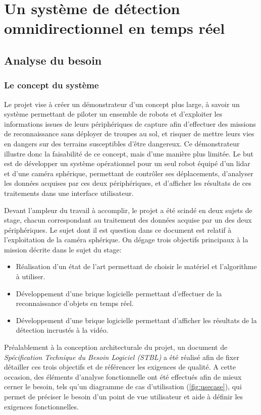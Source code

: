 \chapter{Un système de détection omnidirectionnel en temps réel}

	\section{Analyse du besoin}

		\subsection{Le concept du système}
			
			Le projet vise à créer un démonstrateur d'un concept plus large, à savoir un système permettant de piloter un ensemble de robots et d'exploiter les informations issues de leurs périphériques de capture afin d'effectuer des missions de reconnaissance sans déployer de troupes au sol, et risquer de mettre leurs vies en dangers sur des terrains susceptibles d'être dangereux. Ce démonstrateur illustre donc la faisabilité de ce concept, mais d'une manière plus limitée. Le but est de développer un système opérationnel pour un seul robot équipé d'un \gls{lidar} et d'une caméra sphérique, permettant de contrôler ses déplacements, d'analyser les données acquises par ces deux périphériques, et d'afficher les résultats de ces traitements dans une interface utilisateur.
			\par
			Devant l'ampleur du travail à accomplir, le projet a été scindé en deux sujets de stage, chacun correspondant au traitement des données acquise par un des deux périphériques. Le sujet dont il est question dans ce document est relatif à l'exploitation de la caméra sphérique. On dégage trois objectifs principaux à la mission décrite dans le sujet du stage:
			\begin{itemize}[noitemsep]
				\item Réalisation d'un état de l'art permettant de choisir le matériel et l'algorithme à utiliser.
				\item Développement d'une brique logicielle permettant d'effectuer de la reconnaissance d'objets en temps réel.
				\item Développement d'une brique logicielle permettant d'afficher les résultats de la détection incrustés à la vidéo.
			\end{itemize}
			\par
			Préalablement à la conception architecturale du projet, un document de \emph{Spécification Technique du Besoin Logiciel (STBL)} a été réalisé afin de fixer détailler ces trois objectifs et de référencer les exigences de qualité. A cette occasion, des éléments d'analyse fonctionnelle ont été effectués afin de mieux cerner le besoin, tels qu'un diagramme de cas d'utilisation (\autoref{fig:usecase}), qui permet de préciser le besoin d'un point de vue utilisateur et aide à définir les exigences fonctionnelles.
			
